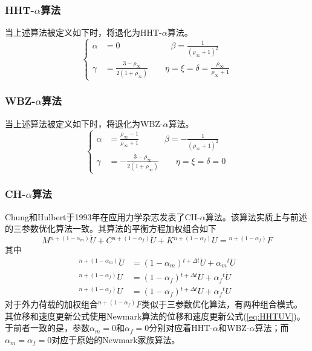 \subsubsection{HHT-$\alpha$算法}
当上述算法被定义如下时，将退化为HHT-$\alpha$算法。
\begin{equation}
\left\{\begin{aligned}
\alpha&=0\qquad\qquad\qquad\beta=\frac{1}{(\rho_{\infty}+1)^2}\\
\gamma&=\frac{3-\rho_{\infty}}{2(1+\rho_{\infty})}\qquad\eta=\xi=\delta=\frac{\rho_{\infty}}{\rho_{\infty}+1}
\end{aligned}\right.
\end{equation}

\subsubsection{WBZ-$\alpha$算法}
当上述算法被定义如下时，将退化为WBZ-$\alpha$算法。
\begin{equation}
\left\{\begin{aligned}
\alpha&=\frac{\rho_{\infty}-1}{\rho_{\infty}+1}\quad\qquad\beta=-\frac{1}{(\rho_{\infty}+1)^2}\\
\gamma&=-\frac{3-\rho_{\infty}}{2(1+\rho_{\infty})}\qquad\eta=\xi=\delta=0
\end{aligned}\right.
\end{equation}

\subsubsection{CH-$\alpha$算法}
Chung和Hulbert于1993年在应用力学杂志发表了CH-$\alpha$算法\cite{Chung1993}。该算法实质上与前述的三参数优化算法一致。其算法的平衡方程加权组合如下
\begin{equation}
M{^{n+(1-\alpha_m)}\!\ddot{U}}+C{^{n+(1-\alpha_f)}\!\dot{U}}+K{^{n+(1-\alpha_f)}\!U}={^{n+(1-\alpha_f)}\!F}
\end{equation}
其中
\begin{subequations}
\begin{align}
{^{n+(1-\alpha_m)}\!\ddot{U}}&=(1-\alpha_m){^{t+\Delta t}\!\ddot{U}}+\alpha_m{^t\!\ddot{U}}\\
{^{n+(1-\alpha_f)}\!\dot{U}}&=(1-\alpha_f){^{t+\Delta t}\!\dot{U}}+\alpha_f{^t\!\dot{U}}\\
{^{n+(1-\alpha_f)}\!{U}}&=(1-\alpha_f){^{t+\Delta t}\!{U}}+\alpha_f{^t\!{U}}
\end{align}
\end{subequations}
对于外力荷载的加权组合${^{n+(1-\alpha_f)}\!F}$类似于三参数优化算法，有两种组合模式。其位移和速度更新公式使用Newmark算法的位移和速度更新公式(\ref{eq:HHTUV})。于前者一致的是，参数$\alpha_m=0$和$\alpha_f=0$分别对应着HHT-$\alpha$和WBZ-$\alpha$算法；而$\alpha_m=\alpha_f=0$对应于原始的Newmark家族算法。

